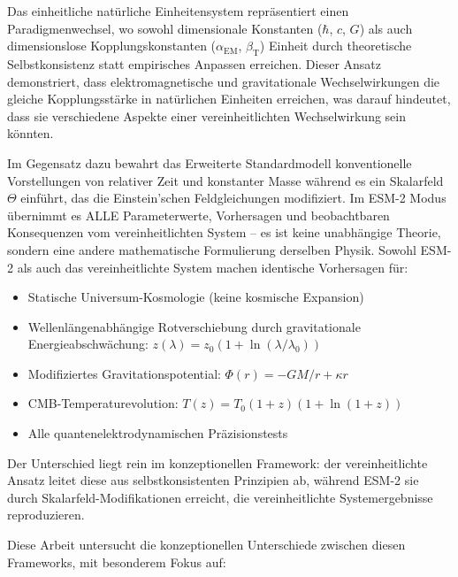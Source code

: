 \documentclass[12pt,a4paper]{article}
\newcommand{\alphaEM}{\alpha_{\text{EM}}}
\newcommand{\betaT}{\beta_{\text{T}}}
\begin{document}
	Das einheitliche natürliche Einheitensystem repräsentiert einen Paradigmenwechsel, wo sowohl dimensionale Konstanten ($\hbar$, $c$, $G$) als auch dimensionslose Kopplungskonstanten ($\alphaEM$, $\betaT$) Einheit durch theoretische Selbstkonsistenz statt empirisches Anpassen erreichen. Dieser Ansatz demonstriert, dass elektromagnetische und gravitationale Wechselwirkungen die gleiche Kopplungsstärke in natürlichen Einheiten erreichen, was darauf hindeutet, dass sie verschiedene Aspekte einer vereinheitlichten Wechselwirkung sein könnten.
	
	Im Gegensatz dazu bewahrt das Erweiterte Standardmodell konventionelle Vorstellungen von relativer Zeit und konstanter Masse während es ein Skalarfeld $\Theta$ einführt, das die Einstein'schen Feldgleichungen modifiziert. Im ESM-2 Modus übernimmt es ALLE Parameterwerte, Vorhersagen und beobachtbaren Konsequenzen vom vereinheitlichten System – es ist keine unabhängige Theorie, sondern eine andere mathematische Formulierung derselben Physik. Sowohl ESM-2 als auch das vereinheitlichte System machen identische Vorhersagen für:
	
	\begin{itemize}
		\item Statische Universum-Kosmologie (keine kosmische Expansion)
		\item Wellenlängenabhängige Rotverschiebung durch gravitationale Energieabschwächung: $z(\lambda) = z_0(1 + \ln(\lambda/\lambda_0))$
		\item Modifiziertes Gravitationspotential: $\Phi(r) = -GM/r + \kappa r$
		\item CMB-Temperaturevolution: $T(z) = T_0(1+z)(1+\ln(1+z))$
		\item Alle quantenelektrodynamischen Präzisionstests
	\end{itemize}
	
	Der Unterschied liegt rein im konzeptionellen Framework: der vereinheitlichte Ansatz leitet diese aus selbstkonsistenten Prinzipien ab, während ESM-2 sie durch Skalarfeld-Modifikationen erreicht, die vereinheitlichte Systemergebnisse reproduzieren.
	
	Diese Arbeit untersucht die konzeptionellen Unterschiede zwischen diesen Frameworks, mit besonderem Fokus auf:
	
\end{document}
